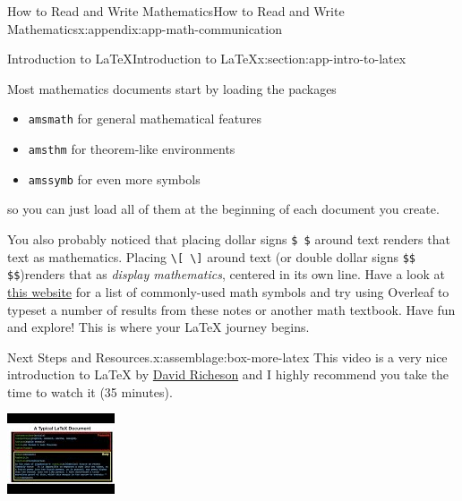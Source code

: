\documentclass[oneside,10pt,]{book}
\newcommand{\mono}[1]{\texttt{#1}}
\numberwithin{equation}{section}
\newlength{\qrsize}
\newlength{\previewwidth}
\begin{document}
\begin{appendixptx}{How to Read and Write Mathematics}{}{How to Read and Write Mathematics}{}{}{x:appendix:app-math-communication}
\begin{sectionptx}{Introduction to \LaTeX{}}{}{Introduction to \LaTeX{}}{}{}{x:section:app-intro-to-latex}
\par
Most mathematics documents start by loading the packages%
\begin{itemize}[label=\textbullet]
\item{}\mono{amsmath} for general mathematical features%
\item{}\mono{amsthm} for theorem-like environments%
\item{}\mono{amssymb} for even more symbols%
\end{itemize}
so you can just load all of them at the beginning of each document you create.%
\par
You also probably noticed that placing dollar signs \mono{\$  \$} around text renders that text as mathematics. Placing \mono{\textbackslash{}[ \textbackslash{}]} around text (or double dollar signs \mono{\$\$   \$\$})renders that as \emph{display mathematics}, centered in its own line. Have a look at \href{https://artofproblemsolving.com/wiki/index.php/LaTeX:Symbols}{this website} for a list of commonly-used math symbols and try using Overleaf to typeset a number of results from these notes or another math textbook. Have fun and explore! This is where your \LaTeX{} journey begins.%
\begin{assemblage}{Next Steps and Resources.}{x:assemblage:box-more-latex}%
This video is a very nice introduction to \LaTeX{} by \href{https://divisbyzero.com/}{David Richeson} and I highly recommend you take the time to watch it (35 minutes).%
\begin{sidebyside}{1}{0}{0}{0}%
\begin{sbspanel}{1}%
\setlength{\qrsize}{9em}
\setlength{\previewwidth}{\linewidth}
\addtolength{\previewwidth}{-\qrsize}
\begin{tcbraster}[raster columns=2, raster column skip=1pt, raster halign=center, raster force size=false, raster left skip=0pt, raster right skip=0pt]%
\begin{tcolorbox}[previewstyle, width=\previewwidth]%
\includegraphics[width=0.80\linewidth,height=\qrsize,keepaspectratio]{images/video-latex.jpg}%

\end{tcolorbox}
\end{tcbraster}
\end{sbspanel}
\end{sidebyside}
\end{assemblage}
\end{sectionptx}
\end{appendixptx}
\end{document}
